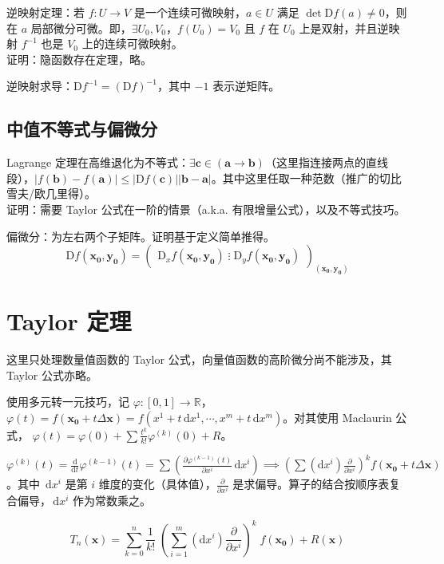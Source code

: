 \documentclass[12pt, a4paper, UTF8, openany]{ctexbook}
\newcommand{\dif}{\mathrm{d}}
\newcommand{\Dif}{\mathrm{D}}
\newcommand{\difx}{\,\mathrm{d}x}
\newcommand{\field}[1]{\mathbb{#1}}%
\newcommand{\mat}[1]{\mathbf{#1}}
\begin{document}
        逆映射定理：若 $f: U \to V$ 是一个连续可微映射，$a \in U$ 满足 $\det \Dif f(a) \neq 0$，则在 $a$ 局部微分可微。即，$\exists U_0, V_0$，$f(U_0) = V_0$ 且 $f$ 在 $U_0$ 上是双射，并且逆映射 $f^{-1}$ 也是 $V_0$ 上的连续可微映射。\\
        证明：隐函数存在定理，略。

        逆映射求导：$\Dif f^{-1} = (\Dif f)^{-1}$，其中 $-1$ 表示逆矩阵。

        \subsection{中值不等式与偏微分}
        Lagrange 定理在高维退化为不等式：$\exists \mat{c} \in (\mat{a} \to \mat{b})$（这里指连接两点的直线段），$|f(\mat{b}) - f(\mat{a})| \leqslant |\Dif f(\mat{c})||\mat{b} - \mat{a}|$。其中这里任取一种范数（推广的切比雪夫/欧几里得）。\\
        证明：需要 Taylor 公式在一阶的情景（a.k.a. 有限增量公式），以及不等式技巧。

        偏微分：为左右两个子矩阵。证明基于定义简单推得。
        $$\Dif f(\mat{x_0}, \mat{y_0}) = \begin{pmatrix}
            \Dif_x f(\mat{x_0}, \mat{y_0}) \; \vdots \; \Dif_y f(\mat{x_0}, \mat{y_0})
        \end{pmatrix}_{(\mat{x_0}, \mat{y_0})}$$

    \section{Taylor 定理}
    这里只处理数量值函数的 Taylor 公式，向量值函数的高阶微分尚不能涉及，其 Taylor 公式亦略。

    使用{\heiti 多元转一元技巧}，记 $\varphi: [0, 1] \to \field{R}$，$\varphi(t) = f(\mat{x_0} + t\Delta\mat{x}) = f(x^1 + t\difx^1, \cdots, x^m + t\difx^m)$。对其使用 Maclaurin 公式， $\varphi(t) = \varphi(0) + \sum \frac{t^k}{k!} \varphi^{(k)}(0) + R$。
    
    $\varphi^{(k)}(t) = \frac{\dif}{\dif t} \varphi^{(k - 1)}(t) = \sum (\frac{\partial \varphi^{(k - 1)}(t)}{\partial x^i} \difx^i) \implies (\sum (\dif x^i) \frac{\partial}{\partial x^i})^k f(\mat{x_0} + t\Delta\mat{x})$。其中 $\difx^i$ 是第 $i$ 维度的变化（具体值），$\frac{\partial}{\partial x^i}$ 是求偏导。算子的结合按顺序表复合偏导，$\difx^i$ 作为常数乘之。

    $$T_n(\mat{x}) = \sum_{k = 0}^n \frac{1}{k!} \; (\sum_{i = 1}^{m} (\dif x^i) \frac{\partial}{\partial x^i})^k \; f(\mat{x_0}) + R(\mat{x})$$
\end{document}
